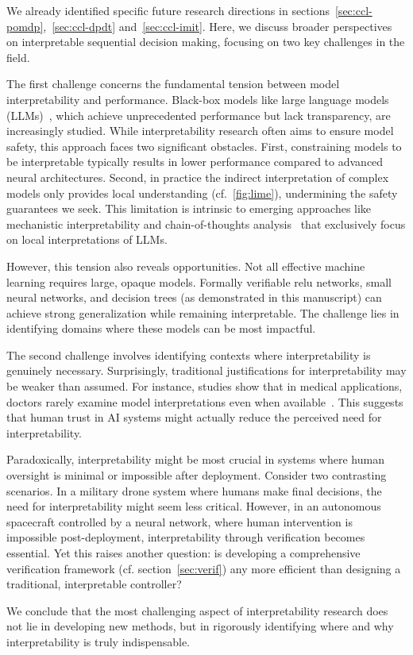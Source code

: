 We already identified specific future research directions in sections~\ref{sec:ccl-pomdp},~\ref{sec:ccl-dpdt} and~\ref{sec:ccl-imit}. Here, we discuss broader perspectives on interpretable sequential decision making, focusing on two key challenges in the field.

The first challenge concerns the fundamental tension between model interpretability and performance. Black-box models like large language models (LLMs)~\cite{all-you-need}, which achieve unprecedented performance but lack transparency, are increasingly studied. While interpretability research often aims to ensure model safety, this approach faces two significant obstacles. First, constraining models to be interpretable typically results in lower performance compared to advanced neural architectures. Second, in practice the indirect interpretation of complex models only provides local understanding (cf.~\ref{fig:lime}), undermining the safety guarantees we seek. This limitation is intrinsic to emerging approaches like mechanistic interpretability and chain-of-thoughts analysis~\cite{barez-chain-2025} that exclusively focus on local interpretations of LLMs.

However, this tension also reveals opportunities. Not all effective machine learning requires large, opaque models. Formally verifiable relu networks, small neural networks, and decision trees (as demonstrated in this manuscript) can achieve strong generalization while remaining interpretable. The challenge lies in identifying domains where these models can be most impactful.

The second challenge involves identifying contexts where interpretability is genuinely necessary. Surprisingly, traditional justifications for interpretability may be weaker than assumed. For instance, studies show that in medical applications, doctors rarely examine model interpretations even when available~\cite{festor}. This suggests that human trust in AI systems might actually reduce the perceived need for interpretability.

Paradoxically, interpretability might be most crucial in systems where human oversight is minimal or impossible after deployment. Consider two contrasting scenarios. In a military drone system where humans make final decisions, the need for interpretability might seem less critical. However, in an autonomous spacecraft controlled by a neural network, where human intervention is impossible post-deployment, interpretability through verification becomes essential. Yet this raises another question: is developing a comprehensive verification framework (cf. section~\ref{sec:verif}) any more efficient than designing a traditional, interpretable controller?

We conclude that the most challenging aspect of interpretability research does not lie in developing new methods, but in rigorously identifying where and why interpretability is truly indispensable.
